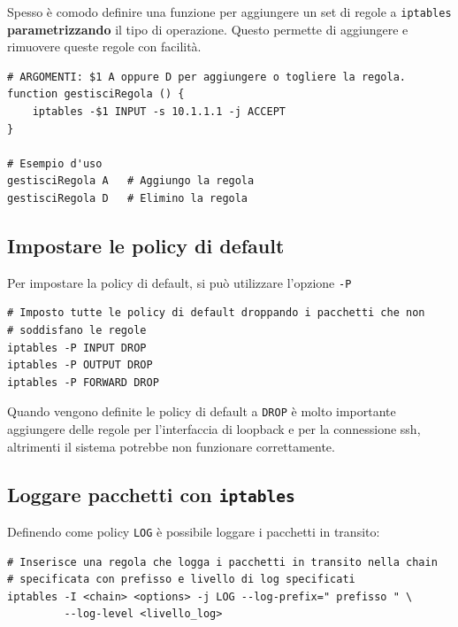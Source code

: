 \documentclass[a4paper]{report}
\newenvironment{ricordati}{\begin{tcolorbox}[fonttitle=\sffamily\bfseries\large,title=Ricordati,colframe=orange!75!white]}{\end{tcolorbox}}
\newenvironment{pattern}{\begin{tcolorbox}[fonttitle=\sffamily\bfseries\large,title=Pattern Ricorrenti,colframe=darkred!75!white]}{\end{tcolorbox}}
\newenvironment{code}{\begin{tcolorbox}[size=small]}{\end{tcolorbox}}
\begin{document}
\begin{pattern}
Spesso è comodo definire una funzione per aggiungere un set di regole a \texttt{iptables} \textbf{parametrizzando} il tipo di operazione. Questo permette di aggiungere e rimuovere queste regole con facilità.

\begin{lstlisting}
# ARGOMENTI: $1 A oppure D per aggiungere o togliere la regola.
function gestisciRegola () {
	iptables -$1 INPUT -s 10.1.1.1 -j ACCEPT
}

# Esempio d'uso
gestisciRegola A   # Aggiungo la regola
gestisciRegola D   # Elimino la regola
\end{lstlisting}
\end{pattern}

\subsection{Impostare le policy di default}

Per impostare la policy di default, si può utilizzare l'opzione \texttt{-P}
\begin{code}
\begin{lstlisting}
# Imposto tutte le policy di default droppando i pacchetti che non 
# soddisfano le regole
iptables -P INPUT DROP
iptables -P OUTPUT DROP
iptables -P FORWARD DROP
\end{lstlisting}
\end{code}

\begin{ricordati}
	Quando vengono definite le policy di default a \texttt{DROP} è molto importante aggiungere delle regole per l'interfaccia di loopback e per la connessione ssh, altrimenti il sistema potrebbe non funzionare correttamente.
\end{ricordati}

\subsection{Loggare pacchetti con \texttt{iptables}}

Definendo come policy \texttt{LOG} è possibile loggare i pacchetti in transito:

\begin{code}
\begin{lstlisting}
# Inserisce una regola che logga i pacchetti in transito nella chain
# specificata con prefisso e livello di log specificati
iptables -I <chain> <options> -j LOG --log-prefix=" prefisso " \
         --log-level <livello_log>
\end{lstlisting}
\end{code}
\end{document}
